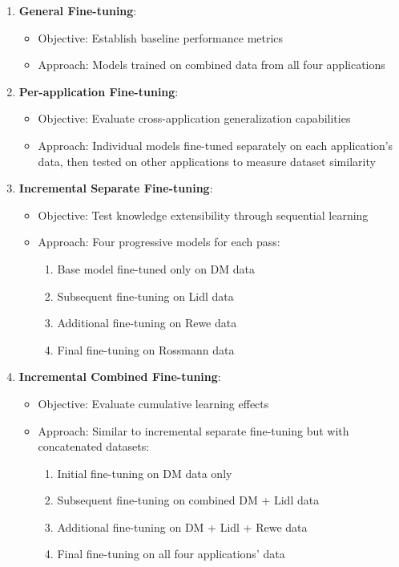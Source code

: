 \documentclass[licencjacka,en]{pracamgr}
\begin{document}
\begin{enumerate}
    \item \textbf{General Fine-tuning}:
    \begin{itemize}
        \item Objective: Establish baseline performance metrics
        \item Approach: Models trained on combined data from all four applications
    \end{itemize}
    
    \item \textbf{Per-application Fine-tuning}:
    \begin{itemize}
        \item Objective: Evaluate cross-application generalization capabilities
        \item Approach: Individual models fine-tuned separately on each application's data, then tested on other applications to measure dataset similarity
    \end{itemize}
    
    \item \textbf{Incremental Separate Fine-tuning}:
    \begin{itemize}
        \item Objective: Test knowledge extensibility through sequential learning
        \item Approach: Four progressive models for each pass:
        \begin{enumerate}
            \item Base model fine-tuned only on DM data
            \item Subsequent fine-tuning on Lidl data
            \item Additional fine-tuning on Rewe data
            \item Final fine-tuning on Rossmann data
        \end{enumerate}
    \end{itemize}
    
    \item \textbf{Incremental Combined Fine-tuning}:
    \begin{itemize}
        \item Objective: Evaluate cumulative learning effects
        \item Approach: Similar to incremental separate fine-tuning but with concatenated datasets:
        \begin{enumerate}
            \item Initial fine-tuning on DM data only
            \item Subsequent fine-tuning on combined DM + Lidl data
            \item Additional fine-tuning on DM + Lidl + Rewe data
            \item Final fine-tuning on all four applications' data
        \end{enumerate}
    \end{itemize}
\end{enumerate}
\end{document}
